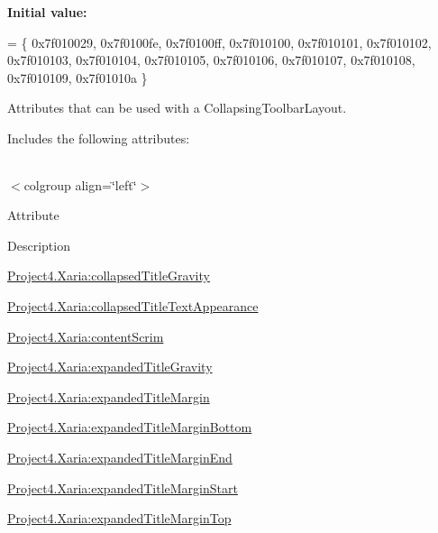 {\bfseries Initial value\+:}
\begin{DoxyCode}
= \{
            0x7f010029, 0x7f0100fe, 0x7f0100ff, 0x7f010100,
            0x7f010101, 0x7f010102, 0x7f010103, 0x7f010104,
            0x7f010105, 0x7f010106, 0x7f010107, 0x7f010108,
            0x7f010109, 0x7f01010a
        \}
\end{DoxyCode}
Attributes that can be used with a Collapsing\+Toolbar\+Layout. 

Includes the following attributes\+:

\tabulinesep=1mm
\begin{longtabu} spread 0pt [c]{*{0}{|X[-1]}|}
\hline
\end{longtabu}
$<$colgroup align=\char`\"{}left\char`\"{}$>$ 

Attribute

Description 

{\ttfamily \hyperlink{classproject4_1_1xaria_1_1R_1_1styleable_a15ca5722add659943b94aec2b6f66a19}{Project4.\+Xaria\+:collapsed\+Title\+Gravity}}

{\ttfamily \hyperlink{classproject4_1_1xaria_1_1R_1_1styleable_a5d38cc3ee657b1c221bbd1c59349c1a8}{Project4.\+Xaria\+:collapsed\+Title\+Text\+Appearance}}

{\ttfamily \hyperlink{classproject4_1_1xaria_1_1R_1_1styleable_aafc0ee2f0a373dd6bea4534c79ce24e2}{Project4.\+Xaria\+:content\+Scrim}}

{\ttfamily \hyperlink{classproject4_1_1xaria_1_1R_1_1styleable_a9a4dfbfaf067b89d3e998221b667aae4}{Project4.\+Xaria\+:expanded\+Title\+Gravity}}

{\ttfamily \hyperlink{classproject4_1_1xaria_1_1R_1_1styleable_a32e897c7aed6567462eb91ece9f149d4}{Project4.\+Xaria\+:expanded\+Title\+Margin}}

{\ttfamily \hyperlink{classproject4_1_1xaria_1_1R_1_1styleable_ab15616401f9effe51d0c5ab4df6399a5}{Project4.\+Xaria\+:expanded\+Title\+Margin\+Bottom}}

{\ttfamily \hyperlink{classproject4_1_1xaria_1_1R_1_1styleable_add3700a4da95b0e9fe9cc81beada966b}{Project4.\+Xaria\+:expanded\+Title\+Margin\+End}}

{\ttfamily \hyperlink{classproject4_1_1xaria_1_1R_1_1styleable_a0dbfb6e3b88ea621358c4ea2f5acc61f}{Project4.\+Xaria\+:expanded\+Title\+Margin\+Start}}

{\ttfamily \hyperlink{classproject4_1_1xaria_1_1R_1_1styleable_acac04a3f2f5421067c31e2d58d3df10d}{Project4.\+Xaria\+:expanded\+Title\+Margin\+Top}}

